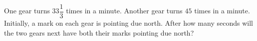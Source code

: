 One gear turns $33\dfrac{1}{3}$ times in a minute. Another gear turns $45$ times in a minute. Initially, a mark on each gear is pointing due north. After how many seconds will the two gears next have both their marks pointing due north?
